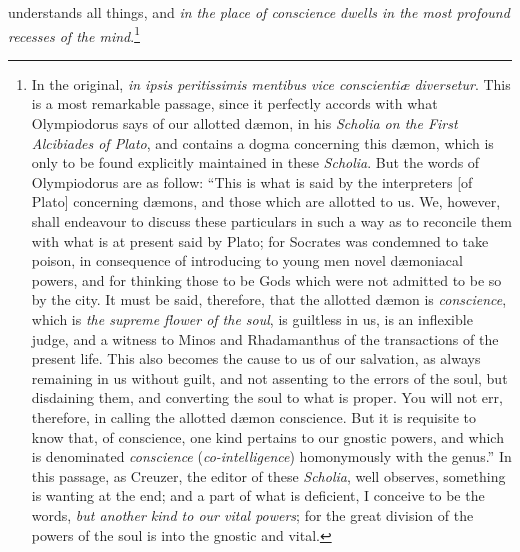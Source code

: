 \documentclass{article}
\begin{document}
understands all things, and \textit{in the place of conscience dwells in the
most profound recesses of the mind}.\footnote{In the original, \textit{in ipsis
peritissimis mentibus vice conscienti{\ae} diversetur}. This is a most
remarkable passage, since it perfectly accords with what Olympiodorus says of
our allotted d{\ae}mon, in his \textit{Scholia on the First Alcibiades of
Plato}, and contains a dogma concerning this d{\ae}mon, which is only to be
found explicitly maintained in these \textit{Scholia}. But the words of
Olympiodorus are as follow: ``This is what is said by the interpreters [of
Plato] concerning d{\ae}mons, and those which are allotted to us. We, however,
shall endeavour to discuss these particulars in such a way as to reconcile them
with what is at present said by Plato; for Socrates was condemned to take
poison, in consequence of introducing to young men novel d{\ae}moniacal powers,
and for thinking those to be Gods which were not admitted to be so by the city.
It must be said, therefore, that the allotted d{\ae}mon is \textit{conscience},
which is \textit{the supreme flower of the soul}, is guiltless in us, is an
inflexible judge, and a witness to Minos and Rhadamanthus of the transactions
of the present life. This also becomes the cause to us of our salvation, as
always remaining in us without guilt, and not assenting to the errors of the
soul, but disdaining them, and converting the soul to what is proper. You will
not err, therefore, in calling the allotted d{\ae}mon conscience. But it is
requisite to know that, of conscience, one kind pertains to our gnostic powers,
and which is denominated \textit{conscience} (\textit{co-intelligence})
homonymously with the genus.'' In this passage, as Creuzer, the editor of these
\textit{Scholia}, well observes, something is wanting at the end; and a part of
what is deficient, I conceive to be the words, \textit{but another kind to our
vital powers}; for the great division of the powers of the soul is into the
gnostic and vital.

}
\end{document}
